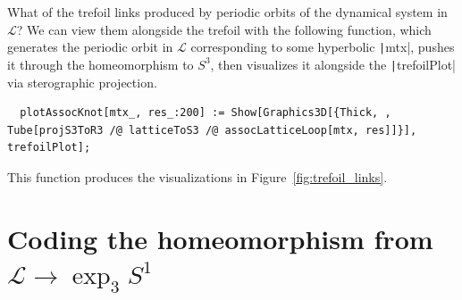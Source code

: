 \documentclass[12pt,twoside]{reedthesis}
\theoremstyle{definition}
\newcommand{\LS}{\mathcal{L}}
\begin{document}
What of the trefoil links produced by periodic orbits of the dynamical system in $\LS$?
We can view them alongside the trefoil with the following function, which generates the periodic orbit in $\LS$ corresponding to some hyperbolic \texttt|mtx|, pushes it through the homeomorphism to $S^3$, then visualizes it alongside the \texttt|trefoilPlot| via sterographic projection.
\begin{verbatim}
  plotAssocKnot[mtx_, res_:200] := Show[Graphics3D[{Thick, , Tube[projS3ToR3 /@ latticeToS3 /@ assocLatticeLoop[mtx, res]]}], trefoilPlot];
\end{verbatim}
This function produces the visualizations in Figure~\ref{fig:trefoil_links}.

\section{Coding the homeomorphism from $\LS \to \exp_3 S^1$}
\end{document}
